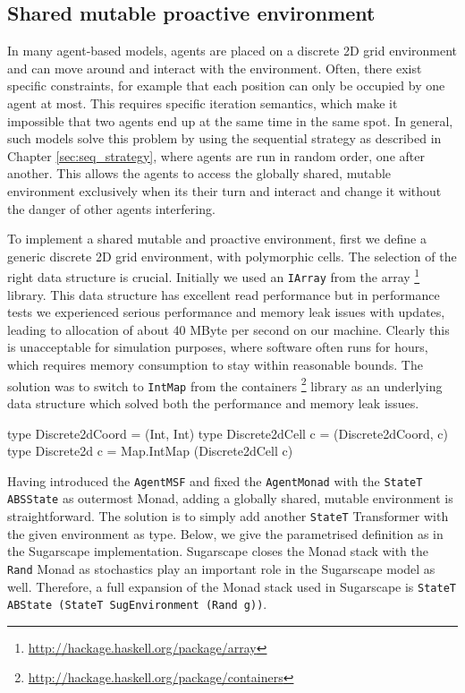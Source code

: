 \subsection{Shared mutable proactive environment}
In many agent-based models, agents are placed on a discrete 2D grid environment and can move around and interact with the environment. Often, there exist specific constraints, for example that each position can only be occupied by one agent at most. This requires specific iteration semantics, which make it impossible that two agents end up at the same time in the same spot. In general, such models solve this problem by using the sequential strategy as described in Chapter \ref{sec:seq_strategy}, where agents are run in random order, one after another. This allows the agents to access the globally shared, mutable environment exclusively when its their turn and interact and change it without the danger of other agents interfering.

To implement a shared mutable and proactive environment, first we define a generic discrete 2D grid environment, with polymorphic cells. The selection of the right data structure is crucial. Initially we used an \texttt{IArray} from the array \footnote{\url{http://hackage.haskell.org/package/array}} library. This data structure has excellent read performance but in performance tests we experienced serious performance and memory leak issues with updates, leading to allocation of about 40 MByte per second on our machine. Clearly this is unacceptable for simulation purposes, where software often runs for hours, which requires memory consumption to stay within reasonable bounds. The solution was to switch to \texttt{IntMap} from the containers \footnote{\url{http://hackage.haskell.org/package/containers}} library as an underlying data structure which solved both the performance and memory leak issues.

\begin{HaskellCode}
type Discrete2dCoord  = (Int, Int)
type Discrete2dCell c = (Discrete2dCoord, c)
type Discrete2d c     = Map.IntMap (Discrete2dCell c)
\end{HaskellCode}

Having introduced the \texttt{AgentMSF} and fixed the \texttt{AgentMonad} with the \texttt{StateT ABSState} as outermost Monad, adding a globally shared, mutable environment is straightforward. The solution is to simply add another \texttt{StateT} Transformer with the given environment as type. Below, we give the parametrised definition as in the Sugarscape implementation. Sugarscape closes the Monad stack with the \texttt{Rand} Monad as stochastics play an important role in the Sugarscape model as well. Therefore, a full expansion of the Monad stack used in Sugarscape is \texttt{StateT ABState (StateT SugEnvironment (Rand g))}.

